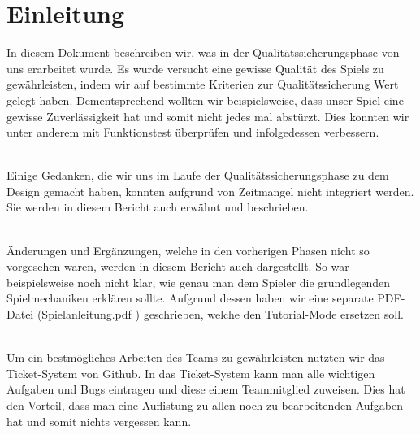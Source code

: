 %



\chapter{Einleitung}
\label{Kapitel:Einleitung}

In diesem Dokument beschreiben wir, was in der Qualitätssicherungsphase von uns erarbeitet wurde. %
Es wurde versucht eine gewisse Qualität des Spiels zu gewährleisten, indem wir auf bestimmte Kriterien zur Qualitätssicherung Wert gelegt haben. Dementsprechend wollten wir beispielsweise, dass unser Spiel eine gewisse Zuverlässigkeit hat und somit nicht jedes mal abstürzt. Dies konnten wir unter anderem mit Funktionstest überprüfen und infolgedessen verbessern.\\~ %

Einige Gedanken, die wir uns im Laufe der Qualitätssicherungsphase zu dem Design gemacht haben, konnten aufgrund von Zeitmangel nicht integriert werden. Sie werden in diesem Bericht auch erwähnt und beschrieben.\\~


Änderungen und Ergänzungen, welche in den vorherigen Phasen nicht so vorgesehen waren, werden in diesem Bericht auch dargestellt. So war beispielsweise noch nicht klar, wie genau man dem Spieler die grundlegenden %
 Spielmechaniken erklären sollte. Aufgrund dessen haben wir eine separate PDF-Datei (\glqq Spielanleitung.pdf \grqq) geschrieben, welche den Tutorial-Mode ersetzen soll.\\~

Um ein bestmögliches Arbeiten des Teams zu gewährleisten nutzten wir das Ticket-System von Github. In das Ticket-System kann man alle wichtigen Aufgaben und Bugs eintragen und diese einem Teammitglied zuweisen. Dies hat den Vorteil, dass man eine Auflistung zu allen noch zu bearbeitenden Aufgaben hat und somit nichts vergessen kann. 
 











